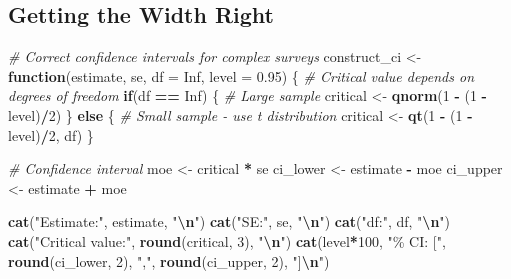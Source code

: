 \documentclass[
]{article}
\newenvironment{Shaded}{\begin{snugshade}}{\end{snugshade}}
\newcommand{\AttributeTok}[1]{\textcolor[rgb]{0.13,0.29,0.53}{#1}}
\newcommand{\CommentTok}[1]{\textcolor[rgb]{0.56,0.35,0.01}{\textit{#1}}}
\newcommand{\ConstantTok}[1]{\textcolor[rgb]{0.56,0.35,0.01}{#1}}
\newcommand{\ControlFlowTok}[1]{\textcolor[rgb]{0.13,0.29,0.53}{\textbf{#1}}}
\newcommand{\DecValTok}[1]{\textcolor[rgb]{0.00,0.00,0.81}{#1}}
\newcommand{\FloatTok}[1]{\textcolor[rgb]{0.00,0.00,0.81}{#1}}
\newcommand{\FunctionTok}[1]{\textcolor[rgb]{0.13,0.29,0.53}{\textbf{#1}}}
\newcommand{\NormalTok}[1]{#1}
\newcommand{\OtherTok}[1]{\textcolor[rgb]{0.56,0.35,0.01}{#1}}
\newcommand{\SpecialCharTok}[1]{\textcolor[rgb]{0.81,0.36,0.00}{\textbf{#1}}}
\newcommand{\StringTok}[1]{\textcolor[rgb]{0.31,0.60,0.02}{#1}}
\begin{document}
\subsection{Getting the Width Right}\label{getting-the-width-right}

\begin{Shaded}
\begin{Highlighting}[]
\CommentTok{\# Correct confidence intervals for complex surveys}
\NormalTok{construct\_ci }\OtherTok{\textless{}{-}} \ControlFlowTok{function}\NormalTok{(estimate, se, }\AttributeTok{df =} \ConstantTok{Inf}\NormalTok{, }\AttributeTok{level =} \FloatTok{0.95}\NormalTok{) \{}
  \CommentTok{\# Critical value depends on degrees of freedom}
  \ControlFlowTok{if}\NormalTok{(df }\SpecialCharTok{==} \ConstantTok{Inf}\NormalTok{) \{}
    \CommentTok{\# Large sample}
\NormalTok{    critical }\OtherTok{\textless{}{-}} \FunctionTok{qnorm}\NormalTok{(}\DecValTok{1} \SpecialCharTok{{-}}\NormalTok{ (}\DecValTok{1} \SpecialCharTok{{-}}\NormalTok{ level)}\SpecialCharTok{/}\DecValTok{2}\NormalTok{)}
\NormalTok{  \} }\ControlFlowTok{else}\NormalTok{ \{}
    \CommentTok{\# Small sample {-} use t distribution}
\NormalTok{    critical }\OtherTok{\textless{}{-}} \FunctionTok{qt}\NormalTok{(}\DecValTok{1} \SpecialCharTok{{-}}\NormalTok{ (}\DecValTok{1} \SpecialCharTok{{-}}\NormalTok{ level)}\SpecialCharTok{/}\DecValTok{2}\NormalTok{, df)}
\NormalTok{  \}}
  
  \CommentTok{\# Confidence interval}
\NormalTok{  moe }\OtherTok{\textless{}{-}}\NormalTok{ critical }\SpecialCharTok{*}\NormalTok{ se}
\NormalTok{  ci\_lower }\OtherTok{\textless{}{-}}\NormalTok{ estimate }\SpecialCharTok{{-}}\NormalTok{ moe}
\NormalTok{  ci\_upper }\OtherTok{\textless{}{-}}\NormalTok{ estimate }\SpecialCharTok{+}\NormalTok{ moe}
  
  \FunctionTok{cat}\NormalTok{(}\StringTok{"Estimate:"}\NormalTok{, estimate, }\StringTok{"}\SpecialCharTok{\textbackslash{}n}\StringTok{"}\NormalTok{)}
  \FunctionTok{cat}\NormalTok{(}\StringTok{"SE:"}\NormalTok{, se, }\StringTok{"}\SpecialCharTok{\textbackslash{}n}\StringTok{"}\NormalTok{)}
  \FunctionTok{cat}\NormalTok{(}\StringTok{"df:"}\NormalTok{, df, }\StringTok{"}\SpecialCharTok{\textbackslash{}n}\StringTok{"}\NormalTok{)}
  \FunctionTok{cat}\NormalTok{(}\StringTok{"Critical value:"}\NormalTok{, }\FunctionTok{round}\NormalTok{(critical, }\DecValTok{3}\NormalTok{), }\StringTok{"}\SpecialCharTok{\textbackslash{}n}\StringTok{"}\NormalTok{)}
  \FunctionTok{cat}\NormalTok{(level}\SpecialCharTok{*}\DecValTok{100}\NormalTok{, }\StringTok{"\% CI: ["}\NormalTok{, }\FunctionTok{round}\NormalTok{(ci\_lower, }\DecValTok{2}\NormalTok{), }\StringTok{","}\NormalTok{, }
      \FunctionTok{round}\NormalTok{(ci\_upper, }\DecValTok{2}\NormalTok{), }\StringTok{"]}\SpecialCharTok{\textbackslash{}n}\StringTok{"}\NormalTok{)}
  

\end{Highlighting}
\end{Shaded}
\end{document}

